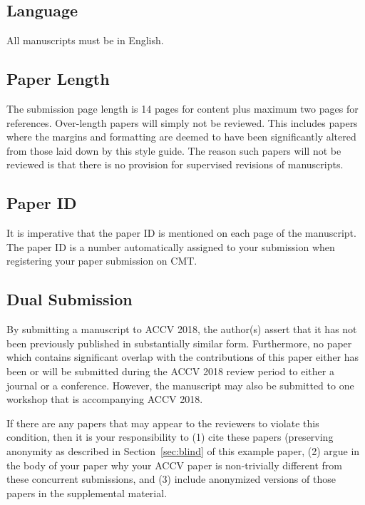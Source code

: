 \documentclass[runningheads]{llncs}
\begin{document}
\subsection{Language}

All manuscripts must be in English.

\subsection{Paper Length}
The submission page length is 14 pages for content plus maximum two pages for references.
Over-length papers will
simply not be reviewed. This includes papers where the margins and
formatting are deemed to have been significantly altered from those
laid down by this style guide. The reason such papers will not be
reviewed is that there is no provision for supervised revisions of
manuscripts. 

\subsection{Paper ID}

It is imperative that the paper ID is mentioned on each page of the manuscript.
The paper ID is a number automatically assigned to your submission when 
registering your paper submission on CMT.

\subsection{Dual Submission}

By submitting a manuscript to ACCV 2018, the author(s) assert that it has
not been previously published in substantially similar
form. Furthermore, no paper which contains significant overlap with
the contributions of this paper either has been or will be submitted
during the ACCV 2018 review period to either a journal or a
conference. However, the manuscript may also be submitted to
one workshop that is accompanying ACCV 2018.

If there are any papers that may appear to the reviewers to violate
this condition, then it is your responsibility to (1) cite these
papers (preserving anonymity as described in Section~\ref{sec:blind}
of this example paper, (2) argue in the body of your paper why your
ACCV paper is non-trivially different from these concurrent
submissions, and (3) include anonymized versions of those papers in
the supplemental material.
\end{document}
